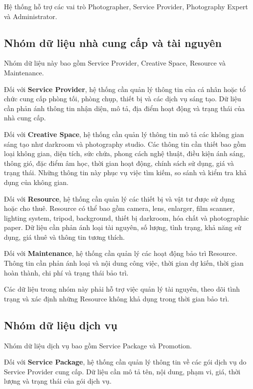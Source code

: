 Hệ thống hỗ trợ các vai trò Photographer, Service Provider, Photography Expert và Administrator.

\subsection{Nhóm dữ liệu nhà cung cấp và tài nguyên}

Nhóm dữ liệu này bao gồm Service Provider, Creative Space, Resource và Maintenance.

Đối với \textbf{Service Provider}, hệ thống cần quản lý thông tin của cá nhân hoặc tổ chức cung cấp phòng tối, phòng chụp, thiết bị và các dịch vụ sáng tạo. Dữ liệu cần phản ánh thông tin nhận diện, mô tả, địa điểm hoạt động và trạng thái của nhà cung cấp.

Đối với \textbf{Creative Space}, hệ thống cần quản lý thông tin mô tả các không gian sáng tạo như darkroom và photography studio. Các thông tin cần thiết bao gồm loại không gian, diện tích, sức chứa, phong cách nghệ thuật, điều kiện ánh sáng, thông gió, đặc điểm âm học, thời gian hoạt động, chính sách sử dụng, giá và trạng thái. Những thông tin này phục vụ việc tìm kiếm, so sánh và kiểm tra khả dụng của không gian.

Đối với \textbf{Resource}, hệ thống cần quản lý các thiết bị và vật tư được sử dụng hoặc cho thuê. Resource có thể bao gồm camera, lens, enlarger, film scanner, lighting system, tripod, background, thiết bị darkroom, hóa chất và photographic paper. Dữ liệu cần phản ánh loại tài nguyên, số lượng, tình trạng, khả năng sử dụng, giá thuê và thông tin tương thích.

Đối với \textbf{Maintenance}, hệ thống cần quản lý các hoạt động bảo trì Resource. Thông tin cần phản ánh loại và nội dung công việc, thời gian dự kiến, thời gian hoàn thành, chi phí và trạng thái bảo trì.

Các dữ liệu trong nhóm này phải hỗ trợ việc quản lý tài nguyên, theo dõi tình trạng và xác định những Resource không khả dụng trong thời gian bảo trì.

\subsection{Nhóm dữ liệu dịch vụ}

Nhóm dữ liệu dịch vụ bao gồm Service Package và Promotion.

Đối với \textbf{Service Package}, hệ thống cần quản lý thông tin về các gói dịch vụ do Service Provider cung cấp. Dữ liệu cần mô tả tên, nội dung, phạm vi, giá, thời lượng và trạng thái của gói dịch vụ.

